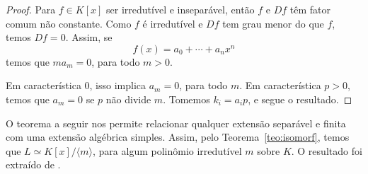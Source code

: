 \begin{proof}
Para $f \in K[x]$ ser irredutível e inseparável, então $f$ e $Df$ têm fator comum não constante. Como $f$ é irredutível e $Df$ tem grau menor do que $f$, temos $Df=0$. Assim, se \[f(x)=a_0 + \cdots + a_nx^n\] temos que $ma_m =0$, para todo $m>0$. \par
Em característica 0, isso implica $a_m=0$, para todo $m$. Em característica $p>0$, temos que $a_m =0$ se $p$ não divide $m$. Tomemos $k_i = a_ip$, e segue o resultado.
\end{proof}
O teorema a seguir nos permite relacionar qualquer extensão separável e finita com uma extensão algébrica simples. Assim, pelo Teorema~\ref{teo:isomorf}, temos que $L \simeq K[x]/\langle m \rangle$, para algum polinômio irredutível $m$ sobre $K$. O resultado foi extraído de \cite[Teorema 1.2.6, p.15]{tese:primitivo}.

